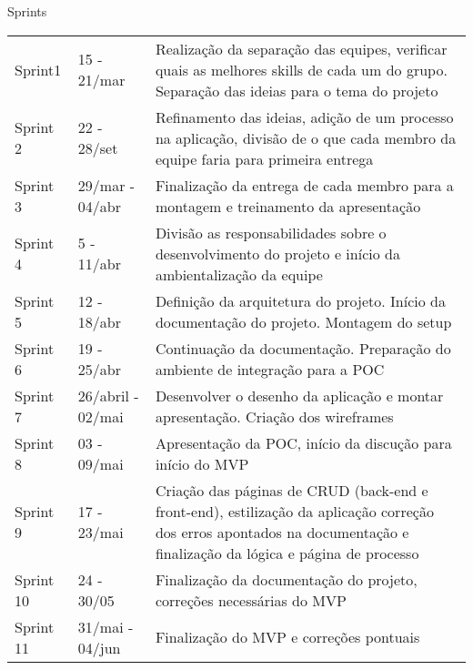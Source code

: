 \begin{quadro}[htb]
	\centering
	\ABNTEXfontereduzida
	\caption[Sprints]{Sprints}
	\label{quadro-atividades}
	\begin{tabular}{|p{1.5cm}|p{3.0cm}|p{10.0cm}|}
		\hline
		\thead{Sprints} & \thead{Período}  & \thead{Atividades} \\
		\hline
		Sprint1 & 15 - 21/mar  & Realização da separação das equipes, verificar quais as melhores skills de cada um do grupo. Separação das ideias para o tema do projeto   \\
		\hline
		Sprint 2 & 22 - 28/set & Refinamento das ideias, adição de um processo na aplicação, divisão de o que cada membro da equipe faria para primeira entrega \\
		\hline
		Sprint 3 & 29/mar - 04/abr  & Finalização da entrega de cada membro para a montagem e treinamento da apresentação \\
		\hline
		Sprint 4 & 5 - 11/abr & Divisão as responsabilidades sobre o desenvolvimento do projeto e início da ambientalização da equipe \\
		\hline
		Sprint 5 & 12 - 18/abr & Definição da arquitetura do projeto. Início da documentação do projeto. Montagem do setup  \\
		\hline
		Sprint 6 & 19 - 25/abr & Continuação da documentação. Preparação do ambiente de integração para a POC \\
		\hline
		Sprint 7 & 26/abril - 02/mai & Desenvolver o desenho da aplicação e montar apresentação. Criação dos wireframes  \\
		\hline
		Sprint 8 & 03 - 09/mai  & Apresentação da POC, início da discução para início do MVP \\
		\hline
		Sprint 9 & 17 - 23/mai  & Criação das páginas de CRUD (back-end e front-end), estilização da aplicação correção dos erros apontados na documentação e finalização da lógica e página de processo  \\
		\hline
		Sprint 10 & 24 - 30/05 & Finalização da documentação do projeto, correções necessárias do MVP \\
		\hline
		Sprint 11 & 31/mai - 04/jun & Finalização do MVP e correções pontuais\\
		\hline
	\end{tabular}
\end{quadro}
